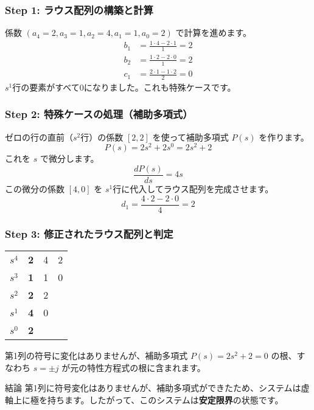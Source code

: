 \documentclass[11pt,a4paper]{ltjsarticle}
\begin{document}
\begin{solution}
    \subsubsection*{Step 1: ラウス配列の構築と計算}
    係数 $(a_4=2, a_3=1, a_2=4, a_1=1, a_0=2)$ で計算を進めます。
    \begin{align*}
        b_1 &= \frac{1 \cdot 4 - 2 \cdot 1}{1} = 2 \\
        b_2 &= \frac{1 \cdot 2 - 2 \cdot 0}{1} = 2 \\
        c_1 &= \frac{2 \cdot 1 - 1 \cdot 2}{2} = 0
    \end{align*}
    $s^1$行の要素がすべて0になりました。これも特殊ケースです。

    \subsubsection*{Step 2: 特殊ケースの処理（補助多項式）}
    ゼロの行の直前（$s^2$行）の係数 $[2, 2]$ を使って補助多項式 $P(s)$ を作ります。
    $$ P(s) = 2s^2 + 2s^0 = 2s^2 + 2 $$
    これを $s$ で微分します。
    $$ \frac{dP(s)}{ds} = 4s $$
    この微分の係数 $[4, 0]$ を $s^1$行に代入してラウス配列を完成させます。
    $$ d_1 = \frac{4 \cdot 2 - 2 \cdot 0}{4} = 2 $$

    \subsubsection*{Step 3: 修正されたラウス配列と判定}
    \begin{center}
    \begin{tabular}{c|ccc}
        \toprule
        $s^4$ & \textbf{2} & 4 & 2 \\
        $s^3$ & \textbf{1} & 1 & 0 \\
        $s^2$ & \textbf{2} & 2 & \\
        $s^1$ & \textbf{4} & 0 & \\
        $s^0$ & \textbf{2} & & \\
        \bottomrule
    \end{tabular}
    \end{center}
    第1列の符号に変化はありませんが、補助多項式 $P(s)=2s^2+2=0$ の根、すなわち $s = \pm j$ が元の特性方程式の根に含まれます。
\end{solution}

\begin{conclusion}{結論}
    第1列に符号変化はありませんが、補助多項式ができたため、システムは虚軸上に極を持ちます。したがって、このシステムは\textbf{安定限界}の状態です。
\end{conclusion}
\end{document}
